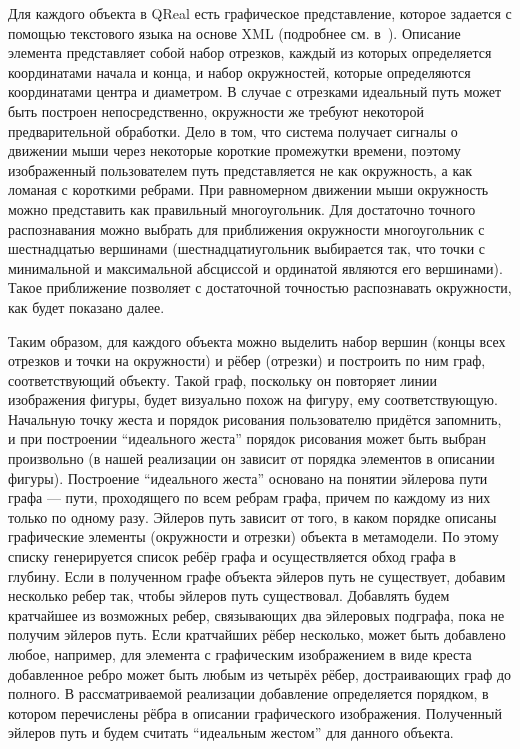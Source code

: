 \documentclass[a5paper]{article}
\begin{document}
Для каждого объекта в QReal есть графическое представление, которое задается с помощью текстового языка на основе XML (подробнее см. в~\cite{qreal}). Описание элемента представляет собой набор отрезков, каждый из которых определяется координатами начала и конца, и набор окружностей, которые определяются координатами центра и диаметром. В случае с отрезками идеальный путь может быть построен непосредственно, окружности же требуют некоторой предварительной обработки. Дело в том, что система получает сигналы о движении мыши через некоторые короткие промежутки времени, поэтому изображенный пользователем путь представляется не как окружность, а как ломаная с короткими ребрами. При равномерном движении мыши окружность можно представить как правильный многоугольник. Для достаточно точного распознавания можно выбрать для приближения окружности многоугольник с шестнадцатью вершинами (шестнадцатиугольник выбирается так, что точки с минимальной и максимальной абсциссой и ординатой являются его вершинами). Такое приближение позволяет с достаточной точностью распознавать окружности, как будет показано далее.

Таким образом, для каждого объекта можно выделить набор вершин (концы всех отрезков и точки на окружности) и рёбер (отрезки) и построить по ним граф, соответствующий объекту. Такой граф, поскольку он повторяет линии изображения фигуры, будет визуально похож на фигуру, ему соответствующую. Начальную точку жеста и порядок рисования пользователю придётся запомнить, и при построении ``идеального жеста'' порядок рисования может быть выбран произвольно (в нашей реализации он зависит от порядка элементов в описании фигуры). Построение ``идеального жеста'' основано на понятии эйлерова пути графа --- пути, проходящего по всем ребрам графа, причем по каждому из них только по одному разу. Эйлеров путь зависит от того, в каком порядке описаны графические элементы (окружности и отрезки) объекта в метамодели. По этому списку генерируется список ребёр графа и осуществляется обход графа в глубину. Если в полученном графе объекта эйлеров путь не существует, добавим несколько ребер так, чтобы эйлеров путь существовал. Добавлять будем кратчайшее из возможных ребер, связывающих два эйлеровых подграфа, пока не получим эйлеров путь. Если кратчайших рёбер несколько, может быть добавлено любое, например, для элемента с графическим изображением в виде креста добавленное ребро может быть любым из четырёх рёбер, достраивающих граф до полного. В рассматриваемой реализации добавление определяется порядком, в котором перечислены рёбра в описании графического изображения. Полученный эйлеров путь и будем считать ``идеальным жестом'' для данного объекта. 
\end{document}
